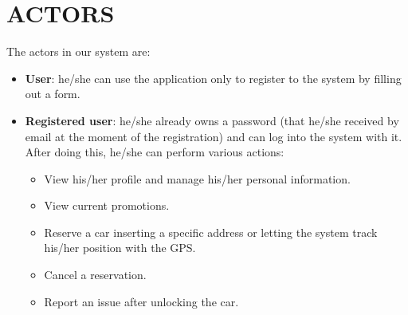 \section{ACTORS}
The actors in our system are:
\begin{itemize}
	\item \textbf{User}: he/she can use the application only to register to the system by filling out a form.
	\item \textbf{Registered user}: he/she already owns a password (that he/she received by email at the moment of the registration) and can log into the system with it. After doing this, he/she can perform various actions:
	\begin{itemize}
		\item View his/her profile and manage his/her personal information.
		\item View current promotions.
		\item Reserve a car inserting a specific address or letting the system track his/her position with the GPS. 
		\item Cancel a reservation.
		\item Report an issue after unlocking the car.
	\end{itemize}
\end{itemize}
